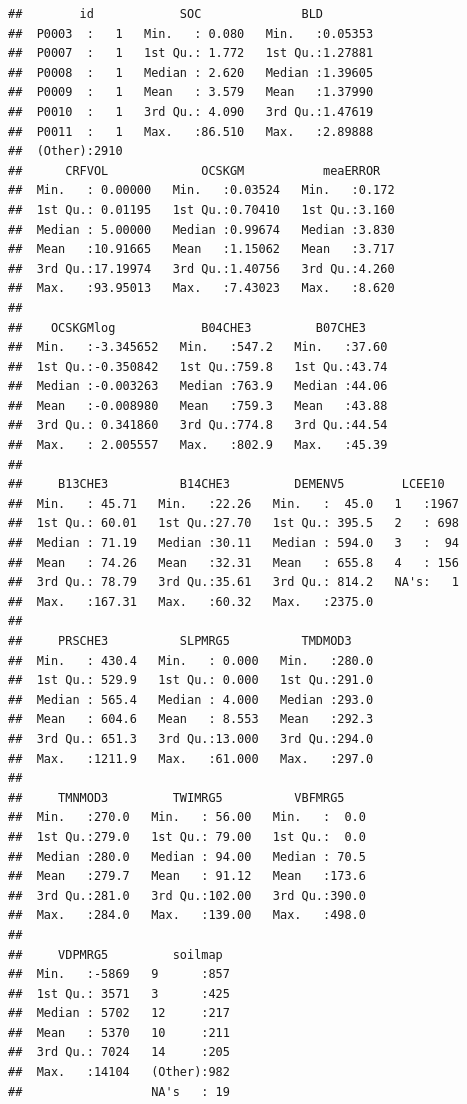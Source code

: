 \documentclass[10pt,b5paper,]{book}
\theoremstyle{definition}
\theoremstyle{definition}
\theoremstyle{definition}
\theoremstyle{remark}
\begin{document}
\begin{verbatim}
##        id            SOC              BLD         
##  P0003  :   1   Min.   : 0.080   Min.   :0.05353  
##  P0007  :   1   1st Qu.: 1.772   1st Qu.:1.27881  
##  P0008  :   1   Median : 2.620   Median :1.39605  
##  P0009  :   1   Mean   : 3.579   Mean   :1.37990  
##  P0010  :   1   3rd Qu.: 4.090   3rd Qu.:1.47619  
##  P0011  :   1   Max.   :86.510   Max.   :2.89888  
##  (Other):2910                                     
##      CRFVOL             OCSKGM           meaERROR    
##  Min.   : 0.00000   Min.   :0.03524   Min.   :0.172  
##  1st Qu.: 0.01195   1st Qu.:0.70410   1st Qu.:3.160  
##  Median : 5.00000   Median :0.99674   Median :3.830  
##  Mean   :10.91665   Mean   :1.15062   Mean   :3.717  
##  3rd Qu.:17.19974   3rd Qu.:1.40756   3rd Qu.:4.260  
##  Max.   :93.95013   Max.   :7.43023   Max.   :8.620  
##                                                      
##    OCSKGMlog            B04CHE3         B07CHE3     
##  Min.   :-3.345652   Min.   :547.2   Min.   :37.60  
##  1st Qu.:-0.350842   1st Qu.:759.8   1st Qu.:43.74  
##  Median :-0.003263   Median :763.9   Median :44.06  
##  Mean   :-0.008980   Mean   :759.3   Mean   :43.88  
##  3rd Qu.: 0.341860   3rd Qu.:774.8   3rd Qu.:44.54  
##  Max.   : 2.005557   Max.   :802.9   Max.   :45.39  
##                                                     
##     B13CHE3          B14CHE3         DEMENV5        LCEE10    
##  Min.   : 45.71   Min.   :22.26   Min.   :  45.0   1   :1967  
##  1st Qu.: 60.01   1st Qu.:27.70   1st Qu.: 395.5   2   : 698  
##  Median : 71.19   Median :30.11   Median : 594.0   3   :  94  
##  Mean   : 74.26   Mean   :32.31   Mean   : 655.8   4   : 156  
##  3rd Qu.: 78.79   3rd Qu.:35.61   3rd Qu.: 814.2   NA's:   1  
##  Max.   :167.31   Max.   :60.32   Max.   :2375.0              
##                                                               
##     PRSCHE3          SLPMRG5          TMDMOD3     
##  Min.   : 430.4   Min.   : 0.000   Min.   :280.0  
##  1st Qu.: 529.9   1st Qu.: 0.000   1st Qu.:291.0  
##  Median : 565.4   Median : 4.000   Median :293.0  
##  Mean   : 604.6   Mean   : 8.553   Mean   :292.3  
##  3rd Qu.: 651.3   3rd Qu.:13.000   3rd Qu.:294.0  
##  Max.   :1211.9   Max.   :61.000   Max.   :297.0  
##                                                   
##     TMNMOD3         TWIMRG5          VBFMRG5     
##  Min.   :270.0   Min.   : 56.00   Min.   :  0.0  
##  1st Qu.:279.0   1st Qu.: 79.00   1st Qu.:  0.0  
##  Median :280.0   Median : 94.00   Median : 70.5  
##  Mean   :279.7   Mean   : 91.12   Mean   :173.6  
##  3rd Qu.:281.0   3rd Qu.:102.00   3rd Qu.:390.0  
##  Max.   :284.0   Max.   :139.00   Max.   :498.0  
##                                                  
##     VDPMRG5         soilmap   
##  Min.   :-5869   9      :857  
##  1st Qu.: 3571   3      :425  
##  Median : 5702   12     :217  
##  Mean   : 5370   10     :211  
##  3rd Qu.: 7024   14     :205  
##  Max.   :14104   (Other):982  
##                  NA's   : 19
\end{verbatim}
\end{document}
